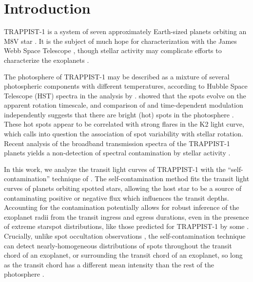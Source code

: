 \section{Introduction}

TRAPPIST-1 is a system of seven approximately Earth-sized planets orbiting an M8V star \citep{Gillon2016, Gillon2017, Luger2017, Delrez2018}. It is the subject of much hope for characterization with the James Webb Space Telescope \citep{Gillon2016,Barstow2016,Morley2017,Batalha2018}, though stellar activity may complicate efforts to characterize the exoplanets \citep{Rackham2018}.

The photosphere of TRAPPIST-1 may be described as a mixture of several photospheric components with different temperatures, according to Hubble Space Telescope (HST) spectra in the analysis by \citet{Zhang2018}. \citet{Roettenbacher2017} showed that the spots evolve on the apparent rotation timescale, and comparison of \kepler and \spitzer time-dependent modulation independently suggests that there are bright (hot) spots in the photosphere \citep{Morris2018c}.  These hot spots appear to be correlated with strong flares in the K2 light curve, which calls into question the association of spot variability with stellar rotation. Recent analysis of the broadband transmission spectra of the TRAPPIST-1 planets yields a non-detection of spectral contamination by stellar activity \citep[upper limit of $200-300$ ppm in the spectra of planets b and d][]{Ducrot2018}.

In this work, we analyze the \spitzer transit light curves of TRAPPIST-1 with the ``self-contamination'' technique of \citet{Morris2018f}. The self-contamination method fits the transit light curves of planets orbiting spotted stars, allowing the host star to be a source of contaminating positive or negative flux which influences the transit depths. Accounting for the contamination potentially allows for robust inference of the exoplanet radii from the transit ingress and egress durations, even in the presence of extreme starspot distributions, like those predicted for TRAPPIST-1 by some \citep{Rackham2018, Zhang2018}. Crucially, unlike spot occultation observations \citep[see e.g.][]{Sanchis-Ojeda2011, Morris2017a}, the self-contamination technique can detect nearly-homogeneous distributions of spots throughout the transit chord of an exoplanet, or surrounding the transit chord of an exoplanet, so long as the transit chord has a different mean intensity than the rest of the photosphere \citep{Morris2018f}.


